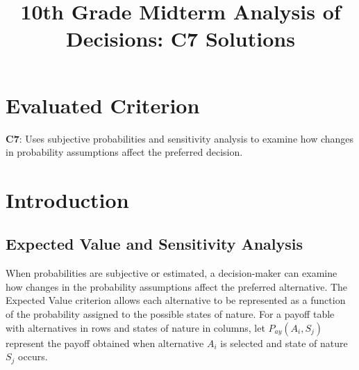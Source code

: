 \makeatletter
{}
\makeatother

%


\title{10th Grade Midterm Analysis of Decisions: C7 Solutions}
\author{}
\date{}


\pagestyle{empty}


	
	\maketitle
	\setcounter{tocdepth}{1}
	\setcounter{secnumdepth}{2}
	\label{toc}
	\vspace*{-20mm}
	\tableofcontents
	
	\section*{Evaluated Criterion}
	
	\textbf{C7}: Uses subjective probabilities and sensitivity analysis to examine how
	changes in probability assumptions affect the preferred decision.
	
	\section{Introduction}\label{sec:c4-introduction}
	\vspace{8mm}
	
	\subsection{Expected Value and Sensitivity Analysis}\label{sec:c4-intro-expected-value}

	
	When probabilities are subjective or estimated, a decision-maker can
	examine how changes in the probability assumptions affect the preferred
	alternative. The Expected Value criterion allows each alternative to be
	represented as a function of the probability assigned to the possible
	states of nature. For a payoff table with alternatives in rows and states of nature in columns, let
	$
	P_{ay}(A_i,S_j)
	$
	represent the payoff obtained when alternative $A_i$ is selected and
	state of nature $S_j$ occurs.
	
